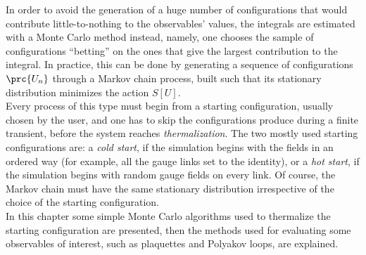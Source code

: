 In order to avoid the generation of a huge number of configurations that would contribute little-to-nothing to the observables' values, the integrals are estimated with a Monte Carlo method instead, namely, one chooses the sample of configurations ``betting'' on the ones that give the largest contribution to the integral. In practice, this can be done by generating a sequence of configurations $\prc{U_n}$ through a Markov chain process, built such that its stationary distribution minimizes the action $S[U]$.\\
Every process of this type must begin from a starting configuration, usually chosen by the user, and one has to skip the configurations produce during a finite transient, before the system reaches \emph{thermalization}.
The two mostly used starting configurations are: a \emph{cold start}, if the simulation begins with the fields in an ordered way (for example, all the gauge links set to the identity), or a \emph{hot start}, if the simulation begins with random gauge fields on every link.
Of course, the Markov chain must have the same stationary distribution irrespective of the choice of the starting configuration.\\
In this chapter some simple Monte Carlo algorithms used to thermalize the starting configuration are presented, then the methods used for evaluating some observables of interest, such as plaquettes and Polyakov loops, are explained.

